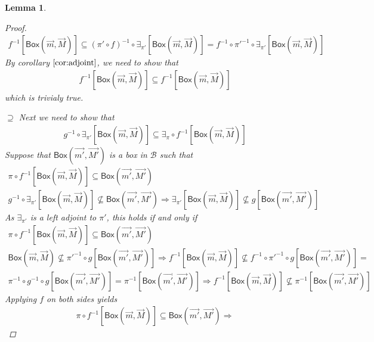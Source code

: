 \documentclass[12pt]{article}
\newtheorem{lemma}[theorem]{Lemma}
\newcommand{\bobject}{\mathsf{Box}}
\begin{document}
\begin{lemma}
\begin{proof}
\begin{gather*}
            f^{-1}[\bobject(\vec{m},\vec{M})]
            \subseteq
            (\pi'\circ f)^{-1}\circ\exists_{\pi'}[\bobject(\vec{m},\vec{M})]=
            f^{-1}\circ\pi'^{-1}\circ\exists_{\pi'}[\bobject(\vec{m},\vec{M})]
        \end{gather*}
        By corollary $\ref*{cor:adjoint}$, we need to show that
        \begin{gather*}
            f^{-1}[\bobject(\vec{m},\vec{M})]
            \subseteq
            f^{-1}[\bobject(\vec{m},\vec{M})]
        \end{gather*}
        which is trivialy true.
        \par $\supseteq$ Next we need to show that
        \begin{gather*}
            g^{-1}\circ\exists_{\pi'}[\bobject(\vec{m},\vec{M})]
            \subseteq
            \exists_\pi\circ f^{-1}[\bobject(\vec{m},\vec{M})]            
        \end{gather*}
        Suppose that $\bobject(\vec{m'},\vec{M'})$ is a box in $\mathcal{B}$ such that
        \begin{gather*}
            \pi\circ f^{-1}[\bobject(\vec{m},\vec{M})]\subseteq \bobject(\vec{m'},\vec{M'})
            \\
            g^{-1}\circ\exists_{\pi'}[\bobject(\vec{m},\vec{M})]\not\subseteq \bobject(\vec{m'},\vec{M'})\Rightarrow 
            \exists_{\pi'}[\bobject(\vec{m},\vec{M})]\not\subseteq g[\bobject(\vec{m'},\vec{M'})]
        \end{gather*}
        As $\exists_{\pi'}$ is a left adjoint to $\pi'$, this holds if and only if
        \begin{gather*}
            \pi\circ f^{-1}[\bobject(\vec{m},\vec{M})]\subseteq \bobject(\vec{m'},\vec{M'})
            \\
            \bobject(\vec{m},\vec{M})\not\subseteq \pi'^{-1}\circ g[\bobject(\vec{m'},\vec{M'})]
            \Rightarrow 
            f^{-1}[\bobject(\vec{m},\vec{M})]\not\subseteq f^{-1}\circ\pi'^{-1}\circ g[\bobject(\vec{m'},\vec{M'})]=
            \\\pi^{-1}\circ g^{-1}\circ g[\bobject(\vec{m'},\vec{M'})]=\pi^{-1}[\bobject(\vec{m'},\vec{M'})]\Rightarrow
            f^{-1}[\bobject(\vec{m},\vec{M})]\not\subseteq \pi^{-1}[\bobject(\vec{m'},\vec{M'})]
        \end{gather*}
        Applying $f$ on both sides yields
        \begin{gather*}
            \pi\circ f^{-1}[\bobject(\vec{m},\vec{M})]\subseteq \bobject(\vec{m'},\vec{M'})\Rightarrow 

\end{gather*}
\end{proof}
\end{lemma}
\end{document}

